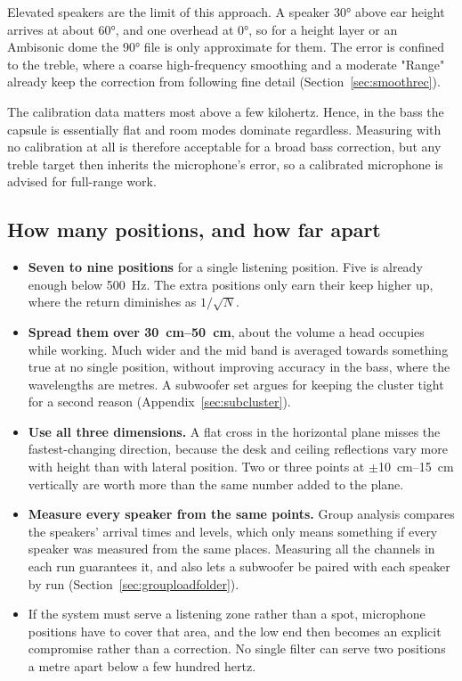 Elevated speakers are the limit of this approach. A speaker \ang{30} above ear height arrives at about \ang{60}, and one overhead at \ang{0}, so for a height layer or an Ambisonic dome the \ang{90} file is only approximate for them. The error is confined to the treble, where a coarse high-frequency smoothing and a moderate "Range" already keep the correction from following fine detail (Section~\ref{sec:smoothrec}).

The calibration data matters most above a few kilohertz. Hence, in the bass the capsule is essentially flat and room modes dominate regardless. Measuring with no calibration at all is therefore acceptable for a broad bass correction, but any treble target then inherits the microphone's error, so a calibrated microphone is advised for full-range work.

\subsection{How many positions, and how far apart}\label{sec:howmany}
\begin{itemize}[nosep]
  \item \textbf{Seven to nine positions} for a single listening position. Five is already enough below \SI{500}{\hertz}. The extra positions only earn their keep higher up, where the return diminishes as $1/\sqrt N$.
  \item \textbf{Spread them over \SIrange{30}{50}{\centi\metre}}, about the volume a head occupies while working. Much wider and the mid band is averaged towards something true at no single position, without improving accuracy in the bass, where the wavelengths are metres. A subwoofer set argues for keeping the cluster tight for a second reason (Appendix~\ref{sec:subcluster}).
  \item \textbf{Use all three dimensions.} A flat cross in the horizontal plane misses the fastest-changing direction, because the desk and ceiling reflections vary more with height than with lateral position. Two or three points at $\pm$\SIrange{10}{15}{\centi\metre} vertically are worth more than the same number added to the plane.
  \item \textbf{Measure every speaker from the same points.} Group analysis compares the speakers' arrival times and levels, which only means something if every speaker was measured from the same places. Measuring all the channels in each run guarantees it, and also lets a subwoofer be paired with each speaker by run (Section~\ref{sec:grouploadfolder}).
  \item If the system must serve a listening zone rather than a spot, microphone positions have to cover that area, and the low end then becomes an explicit compromise rather than a correction. No single filter can serve two positions a metre apart below a few hundred hertz.
\end{itemize}

